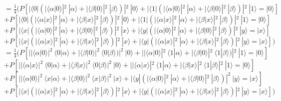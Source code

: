 \documentclass[a4paper]{scrartcl}
\begin{document}
\begin{enumerate}[a)]
$=\frac{1}{4} (P[|\langle 0|(|\langle \alpha|0\rangle|^2~|\alpha\rangle + |\langle \beta|0\rangle|^2~|\beta\rangle)|^2~|0\rangle + |\langle 1|(|\langle \alpha|0\rangle|^2~|\alpha\rangle + |\langle \beta|0\rangle|^2~|\beta\rangle)|^2~|1\rangle=|0\rangle]$\\
$+ P[|\langle 0|(|\langle \alpha|x\rangle|^2~|\alpha\rangle + |\langle \beta|x\rangle|^2~|\beta\rangle)|^2~|0\rangle + |\langle 1|(|\langle \alpha|x\rangle|^2~|\alpha\rangle + |\langle \beta|x\rangle|^2~|\beta\rangle)|^2~|1\rangle =|0\rangle]$\\
$+ P[|\langle x| (|\langle \alpha|0\rangle|^2~|\alpha\rangle + |\langle \beta|0\rangle|^2~|\beta\rangle)|^2~|x\rangle + |\langle y| (|\langle \alpha|0\rangle|^2~|\alpha\rangle + |\langle \beta|0\rangle|^2~|\beta\rangle)|^2~|y\rangle =|x\rangle]$\\
$+ P[|\langle x| (|\langle \alpha|x\rangle|^2~|\alpha\rangle + |\langle \beta|x\rangle|^2~|\beta\rangle)|^2~|x\rangle + |\langle y| (|\langle \alpha|x\rangle|^2~|\alpha\rangle + |\langle \beta|x\rangle|^2~|\beta\rangle)|^2~|y\rangle =|x\rangle])$\\
$=\frac{1}{4} (P[||\langle \alpha|0\rangle|^2~\langle 0|\alpha\rangle + |\langle \beta|0\rangle|^2~\langle 0|\beta\rangle)|^2~|0\rangle + ||\langle \alpha|0\rangle|^2~\langle 1|\alpha\rangle + |\langle \beta|0\rangle|^2~\langle 1|\beta\rangle)|^2~|1\rangle=|0\rangle]$\\
$+ P[||\langle \alpha|x\rangle|^2~\langle 0|\alpha\rangle + |\langle \beta|x\rangle|^2~\langle 0|\beta\rangle|^2~|0\rangle + ||\langle \alpha|x\rangle|^2~\langle 1|\alpha\rangle + |\langle \beta|x\rangle|^2~\langle 1|\beta\rangle|^2~|1\rangle =|0\rangle]$\\
$+ P[||\langle \alpha|0\rangle|^2~\langle x|\alpha\rangle + |\langle \beta|0\rangle|^2~\langle x|\beta\rangle|^2~|x\rangle + |\langle y| (|\langle \alpha|0\rangle|^2~|\alpha\rangle + |\langle \beta|0\rangle|^2~|\beta\rangle)|^2~|y\rangle =|x\rangle]$\\
$+ P[|\langle x| (|\langle \alpha|x\rangle|^2~|\alpha\rangle + |\langle \beta|x\rangle|^2~|\beta\rangle)|^2~|x\rangle + |\langle y| (|\langle \alpha|x\rangle|^2~|\alpha\rangle + |\langle \beta|x\rangle|^2~|\beta\rangle)|^2~|y\rangle =|x\rangle])$\\




\end{enumerate}
\end{document}
